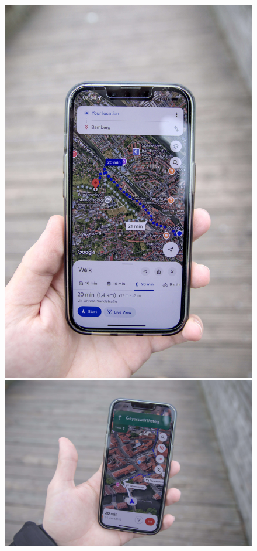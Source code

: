 \begin{figure}[h]
    \centering
    \begin{minipage}{.4\textwidth}
        \centering
        \includegraphics[width=0.7\linewidth]{figures/geocaching/first/IMG_3082.jpg}
    \end{minipage}%
    \begin{minipage}{.6\textwidth}
        \centering
        \includegraphics[width=\linewidth]{figures/geocaching/first/IMG_3085.jpg}
    \end{minipage}
\end{figure}


